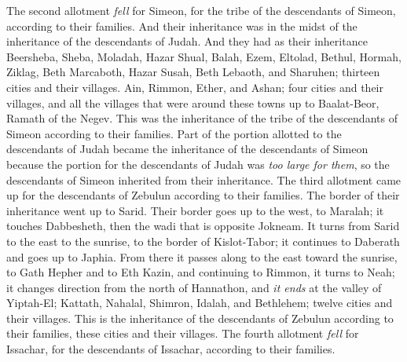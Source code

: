 \begin{biblechapter} %
 The second allotment \textit{fell} for Simeon, for the tribe of the descendants of Simeon, according to their families. And their inheritance was in the midst of the inheritance of the descendants of Judah.
\verse And they had as their inheritance Beersheba, Sheba, Moladah,
\verse Hazar Shual, Balah, Ezem,
\verse Eltolad, Bethul, Hormah,
\verse Ziklag, Beth Marcaboth, Hazar Susah,
\verse Beth Lebaoth, and Sharuhen; thirteen cities and their villages.
\verse Ain, Rimmon, Ether, and Ashan; four cities and their villages,
\verse and all the villages that were around these towns up to Baalat-Beor, Ramath of the Negev. This was the inheritance of the tribe of the descendants of Simeon according to their families.
\verse Part of the portion allotted to the descendants of Judah became the inheritance of the descendants of Simeon because the portion for the descendants of Judah was \textit{too large for them}, so the descendants of Simeon inherited from their inheritance.
 The third allotment came up for the descendants of Zebulun according to their families. The border of their inheritance went up to Sarid.
\verse Their border goes up to the west, to Maralah; it touches Dabbesheth, then the wadi that is opposite Jokneam.
\verse It turns from Sarid to the east to the sunrise, to the border of Kislot-Tabor; it continues to Daberath and goes up to Japhia.
\verse From there it passes along to the east toward the sunrise, to Gath Hepher and to Eth Kazin, and continuing to Rimmon, it turns to Neah;
\verse it changes direction from the north of Hannathon, and \textit{it ends} at the valley of Yiptah-El;
\verse Kattath, Nahalal, Shimron, Idalah, and Bethlehem; twelve cities and their villages.
\verse This is the inheritance of the descendants of Zebulun according to their families, these cities and their villages.
 The fourth allotment \textit{fell} for Issachar, for the descendants of Issachar, according to their families.

\end{biblechapter}
